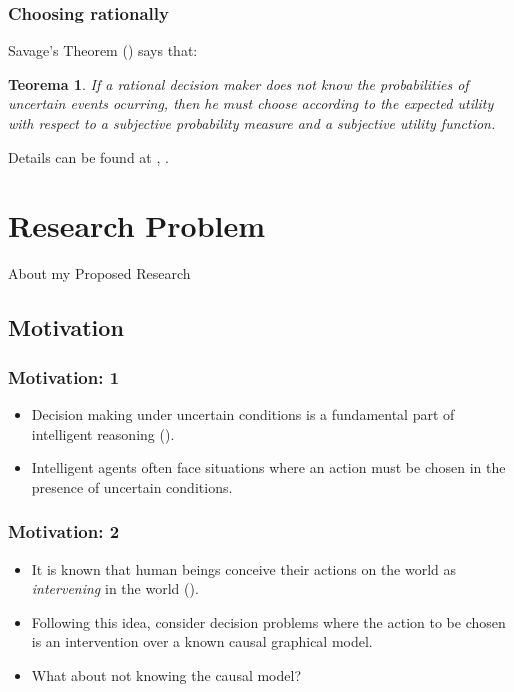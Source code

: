 \documentclass{beamer}
\theoremstyle{plain}
\newtheorem{teo}{Teorema}
\begin{document}
	\begin{frame}
	\frametitle{Choosing rationally}
	Savage's Theorem (\cite{savage1954the}) says that:
\begin{teo}	
	If a rational decision maker does not know the probabilities of uncertain events ocurring, then he must choose according to the expected utility with respect to a \textit{subjective} probability measure and a \textit{subjective} utility function.
\end{teo}
Details can be found at \cite{bernardo2000bayesian}, \cite{gilboa2009decision}.
	\end{frame}

\section{Research Problem}
\begin{frame}
About my Proposed Research
\end{frame}
	\subsection{Motivation}
	\begin{frame}
	\frametitle{Motivation: 1}
	\begin{itemize}
	\item Decision making under uncertain conditions is a fundamental part of intelligent reasoning (\cite{lake2017building}).
	\item Intelligent agents often face situations where an action must be chosen in the presence of uncertain conditions.
	\end{itemize}
	\end{frame}
	\begin{frame}
	\frametitle{Motivation: 2}
	\begin{itemize}
	\item It is known that human beings conceive their actions on the world as \textit{intervening} in the world (\cite{hagmayer2009decision}).
	\item Following this idea, \cite{lattimoreNIPS2016} consider decision problems where the action to be chosen is an intervention over a known causal graphical model.
	\item What about not knowing the causal model? 
	\end{itemize}
	\end{frame}
	
\end{document}
